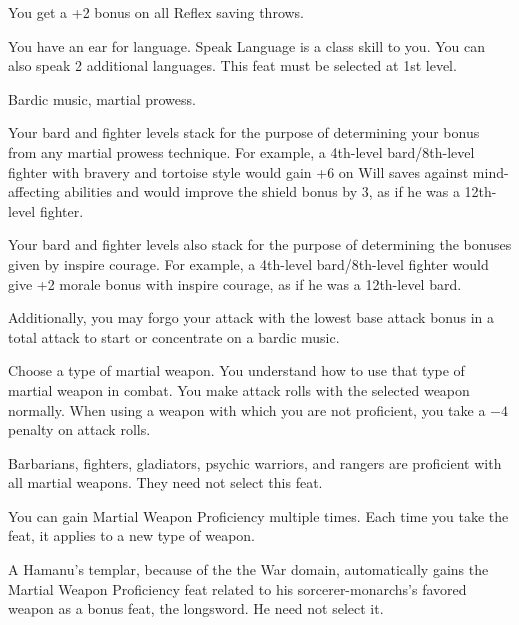 {You get a +2 bonus on all Reflex saving throws.}

{You have an ear for language.}{}
{Speak Language is a class skill to you. You can also speak 2 additional languages.}{}
{This feat must be selected at 1st level.}

{Bardic music, martial prowess.}
{
Your bard and fighter levels stack for the purpose of determining your bonus from any martial prowess technique. For example, a 4th-level bard/8th-level fighter with bravery and tortoise style would gain +6 on Will saves against mind-affecting abilities and would improve the shield bonus by 3, as if he was a 12th-level fighter.

Your bard and fighter levels also stack for the purpose of determining the bonuses given by inspire courage. For example, a 4th-level bard/8th-level fighter would give +2 morale bonus with inspire courage, as if he was a 12th-level bard.

Additionally, you may forgo your attack with the lowest base attack bonus in a total attack to start or concentrate on a bardic music.
}



{Choose a type of martial weapon. You understand how to use that type of martial weapon in combat.}
{}
{You make attack rolls with the selected weapon normally.}
{When using a weapon with which you are not proficient, you take a $-4$ penalty on attack rolls.}
{Barbarians, fighters, gladiators, psychic warriors, and rangers are proficient with all martial weapons. They need not select this feat.

You can gain Martial Weapon Proficiency multiple times. Each time you take the feat, it applies to a new type of weapon.

A Hamanu's templar, because of the the War domain, automatically gains the Martial Weapon Proficiency feat related to his sorcerer-monarchs's favored weapon as a bonus feat, the longsword. He need not select it.}

